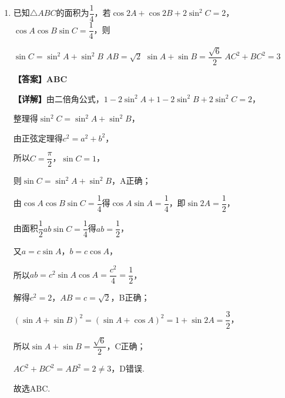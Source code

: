 \documentclass[12pt,a4paper]{article}
\begin{document}
\begin{enumerate}[leftmargin=*,label=\arabic*.,resume,itemsep=0.8ex]
		$|AB|=x_1+x_2+3=6m^2+6\ge6$，当$m=0$时取等号，C正确；
		
		对于D：因$EF\perp AB$，$|AE|^2=|AF|^2+|EF|^2$，$|BE|^2=|BF|^2+|EF|^2$，
		
		结合焦半径公式计算可得$|AE|\cdot|BE|\ge18$，当且仅当$m=0$时取等号，D正确.
		
		故选ACD.
		
		\item 已知$\triangle ABC$的面积为$\dfrac14$，若$\cos2A+\cos2B+2\sin^2C=2$，$\cos A\cos B\sin C=\dfrac14$，则
		\begin{choicesTwo}
			\choice $\sin C=\sin^2A+\sin^2B$
			\choice $AB=\sqrt2$
			\choice $\sin A+\sin B=\dfrac{\sqrt6}{2}$
			\choice $AC^2+BC^2=3$
		\end{choicesTwo}
		\textbf{【答案】ABC}
		
		\textbf{【详解】}由二倍角公式，$1-2\sin^2A+1-2\sin^2B+2\sin^2C=2$，
		
		整理得$\sin^2C=\sin^2A+\sin^2B$，
		
		由正弦定理得$c^2=a^2+b^2$，
		
		所以$C=\dfrac{\pi}{2}$，$\sin C=1$，
		
		则$\sin C=\sin^2A+\sin^2B$，A正确；
		
		由$\cos A\cos B\sin C=\dfrac14$得$\cos A\sin A=\dfrac14$，即$\sin2A=\dfrac12$，
		
		由面积$\dfrac12 ab\sin C=\dfrac14$得$ab=\dfrac12$，
		
		又$a=c\sin A$，$b=c\cos A$，
		
		所以$ab=c^2\sin A\cos A=\dfrac{c^2}{4}=\dfrac12$，
		
		解得$c^2=2$，$AB=c=\sqrt2$，B正确；
		
		$(\sin A+\sin B)^2=(\sin A+\cos A)^2=1+\sin2A=\dfrac32$，
		
		所以$\sin A+\sin B=\dfrac{\sqrt6}{2}$，C正确；
		
		$AC^2+BC^2=AB^2=2\ne3$，D错误.
		
		故选ABC.
		
	\end{enumerate}
	\vspace{0.3cm}
\end{document}
